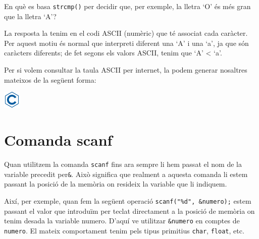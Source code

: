 \documentclass[]{book}
\newenvironment{Shaded}{\begin{snugshade}}{\end{snugshade}}
\newcommand{\DataTypeTok}[1]{\textcolor[rgb]{0.13,0.29,0.53}{#1}}
\newcommand{\DecValTok}[1]{\textcolor[rgb]{0.00,0.00,0.81}{#1}}
\newcommand{\SpecialCharTok}[1]{\textcolor[rgb]{0.00,0.00,0.00}{#1}}
\newcommand{\StringTok}[1]{\textcolor[rgb]{0.31,0.60,0.02}{#1}}
\newcommand{\ImportTok}[1]{#1}
\newcommand{\CommentTok}[1]{\textcolor[rgb]{0.56,0.35,0.01}{\textit{#1}}}
\newcommand{\ControlFlowTok}[1]{\textcolor[rgb]{0.13,0.29,0.53}{\textbf{#1}}}
\newcommand{\PreprocessorTok}[1]{\textcolor[rgb]{0.56,0.35,0.01}{\textit{#1}}}
\newcommand{\NormalTok}[1]{#1}
\begin{document}
En què es basa \texttt{strcmp()} per decidir que, per exemple, la lletra
`O' és més gran que la lletra `A'?

La resposta la tenim en el codi ASCII (numèric) que té associat cada
caràcter. Per aquest motiu és normal que interpreti diferent una `A' i
una `a', ja que són caràcters diferents; de fet segons els valors ASCII,
tenim que `A' \textless{} `a'.

Per si volem consultar la taula ASCII per internet, la podem generar
nosaltres mateixos de la següent forma:

\includegraphics{./img/c.png}

\begin{Shaded}
\end{Shaded}

\section{Comanda scanf}\label{comanda-scanf}

Quan utilitzem la comanda \texttt{scanf} fins ara sempre li hem passat
el nom de la variable precedit per\texttt{\&}. Això significa que
realment a aquesta comanda li estem passant la posició de la memòria on
resideix la variable que li indiquem.

Així, per exemple, quan fem la següent operació
\texttt{scanf("\%d",\ \&numero);} estem passant el valor que introduïm
per teclat directament a la posició de memòria on tenim desada la
variable numero. D'aquí ve utilitzar \texttt{\&numero} en comptes de
\texttt{numero}. El mateix comportament tenim pels tipus primitius
\texttt{char}, \texttt{float}, etc.
\end{document}
